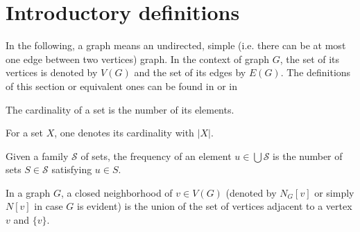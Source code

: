 \section{Introductory definitions}
In the following, a graph means an undirected, simple (i.e. there can be at most one edge between two vertices) graph. In the context of graph $G$, the set of its vertices is denoted by $V(G)$ and the set of its edges by $E(G)$. The definitions of this section or equivalent ones can be found in \cite{bollobas1998modern} or in \cite{DBLP:journals/eatcs/FominGK05}
\begin{definition}[cardinality]
The cardinality of a set is the number of its elements.
\end{definition}
For a set $X$, one denotes its cardinality with $|X|$.
\begin{definition}[frequency]
Given a family $\mathcal{S}$ of sets, the frequency of an element $u \in \bigcup \mathcal{S}$ is the number of sets $S \in \mathcal{S}$ satisfying $u\in S$.
\end{definition}
\begin{definition}
In a graph $G$, a closed neighborhood of $v \in V(G)$ (denoted by $N_G[v]$ or simply $N[v]$ in case $G$ is evident) is the union of the set of vertices adjacent to a vertex $v$ and $\{v\}$.
\end{definition}
